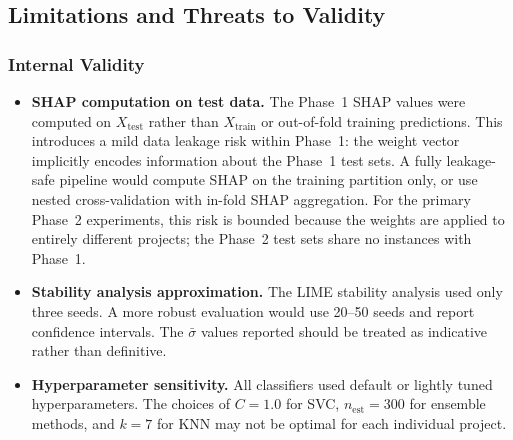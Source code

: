 \documentclass[12pt, a4paper]{article}
\newcommand{\model}[1]{\textsf{#1}}
\begin{document}
\subsection{Limitations and Threats to Validity}
\label{sec:threats}

\subsubsection*{Internal Validity}
\begin{itemize}[leftmargin=*, itemsep=3pt]
  \item \textbf{SHAP computation on test data.} The Phase~1 SHAP values were
        computed on $X_\text{test}$ rather than $X_\text{train}$ or
        out-of-fold training predictions. This introduces a mild data leakage
        risk within Phase~1: the weight vector implicitly encodes information
        about the Phase~1 test sets. A fully leakage-safe pipeline would
        compute SHAP on the training partition only, or use nested
        cross-validation with in-fold SHAP aggregation. For the primary
        Phase~2 experiments, this risk is bounded because the weights are
        applied to entirely different projects; the Phase~2 test sets share no
        instances with Phase~1.

  \item \textbf{Stability analysis approximation.} The LIME stability
        analysis used only three seeds. A more robust evaluation would use
        20--50 seeds and report confidence intervals. The $\bar{\sigma}$ values
        reported should be treated as indicative rather than definitive.

  \item \textbf{Hyperparameter sensitivity.} All classifiers used default or
        lightly tuned hyperparameters. The choices of $C=1.0$ for \model{SVC},
        $n_\text{est}=300$ for ensemble methods, and $k=7$ for \model{KNN} may
        not be optimal for each individual project.
\end{itemize}
\end{document}
